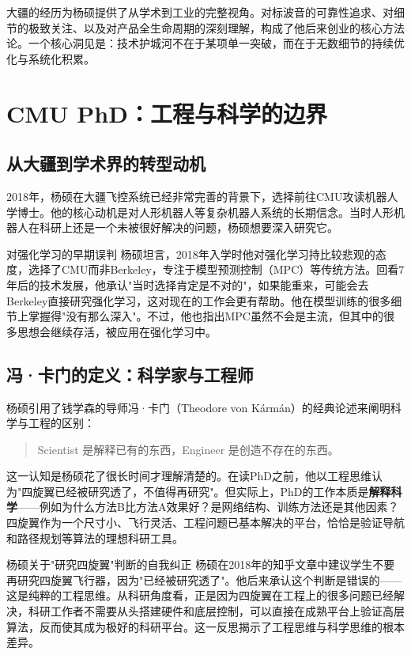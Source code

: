 \documentclass[a4paper]{article}
\begin{document}
大疆的经历为杨硕提供了从学术到工业的完整视角。对标波音的可靠性追求、对细节的极致关注、以及对产品全生命周期的深刻理解，构成了他后来创业的核心方法论。一个核心洞见是：技术护城河不在于某项单一突破，而在于无数细节的持续优化与系统化积累。


\section{CMU PhD：工程与科学的边界}

\subsection{从大疆到学术界的转型动机}

2018年，杨硕在大疆飞控系统已经非常完善的背景下，选择前往CMU攻读机器人学博士。他的核心动机是对人形机器人等复杂机器人系统的长期信念。当时人形机器人在科研上还是一个未被很好解决的问题，杨硕想要深入研究它。

\begin{warningbox}{对强化学习的早期误判}
杨硕坦言，2018年入学时他对强化学习持比较悲观的态度，选择了CMU而非Berkeley，专注于模型预测控制（MPC）等传统方法。回看7年后的技术发展，他承认"当时选择肯定是不对的"，如果能重来，可能会去Berkeley直接研究强化学习，这对现在的工作会更有帮助。他在模型训练的很多细节上掌握得"没有那么深入"。不过，他也指出MPC虽然不会是主流，但其中的很多思想会继续存活，被应用在强化学习中。
\end{warningbox}

\subsection{冯·卡门的定义：科学家与工程师}

杨硕引用了钱学森的导师冯·卡门（Theodore von K\'arm\'an）的经典论述来阐明科学与工程的区别：

\begin{quote}
Scientist 是解释已有的东西，Engineer 是创造不存在的东西。
\end{quote}

这一认知是杨硕花了很长时间才理解清楚的。在读PhD之前，他以工程思维认为"四旋翼已经被研究透了，不值得再研究"。但实际上，PhD的工作本质是\textbf{解释科学}——例如为什么方法B比方法A效果好？是网络结构、训练方法还是其他因素？四旋翼作为一个尺寸小、飞行灵活、工程问题已基本解决的平台，恰恰是验证导航和路径规划等算法的理想科研工具。

\begin{knowledgebox}{杨硕关于"研究四旋翼"判断的自我纠正}
杨硕在2018年的知乎文章中建议学生不要再研究四旋翼飞行器，因为"已经被研究透了"。他后来承认这个判断是错误的——这是纯粹的工程思维。从科研角度看，正是因为四旋翼在工程上的很多问题已经解决，科研工作者不需要从头搭建硬件和底层控制，可以直接在成熟平台上验证高层算法，反而使其成为极好的科研平台。这一反思揭示了工程思维与科学思维的根本差异。
\end{knowledgebox}
\end{document}
